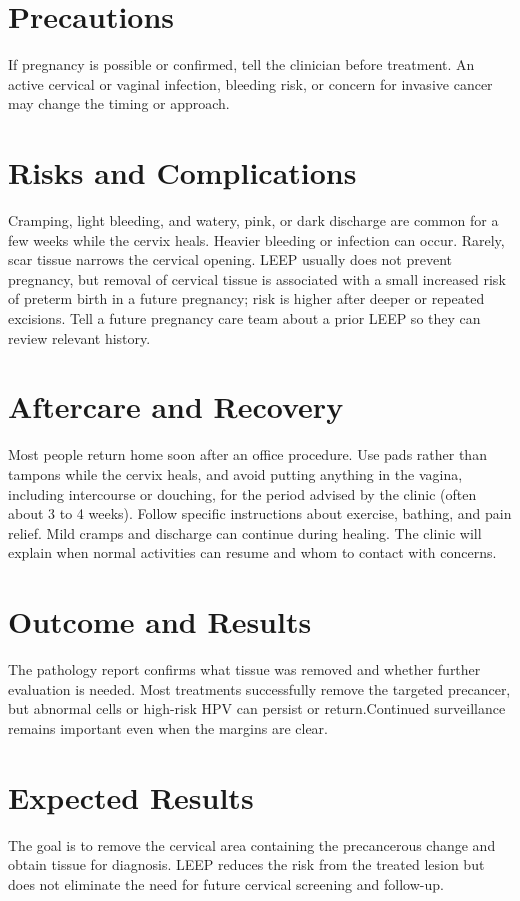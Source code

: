 \section*{Precautions}
If pregnancy is possible or confirmed, tell the clinician before treatment. An active cervical or vaginal infection, bleeding risk, or concern for invasive cancer may change the timing or approach.

\section*{Risks and Complications}
Cramping, light bleeding, and watery, pink, or dark discharge are common for a few weeks while the cervix heals. Heavier bleeding or infection can occur. Rarely, scar tissue narrows the cervical opening. LEEP usually does not prevent pregnancy, but removal of cervical tissue is associated with a small increased risk of preterm birth in a future pregnancy; risk is higher after deeper or repeated excisions. Tell a future pregnancy care team about a prior LEEP so they can review relevant history.

\section*{Aftercare and Recovery}
Most people return home soon after an office procedure. Use pads rather than tampons while the cervix heals, and avoid putting anything in the vagina, including intercourse or douching, for the period advised by the clinic (often about 3 to 4 weeks). Follow specific instructions about exercise, bathing, and pain relief. Mild cramps and discharge can continue during healing. The clinic will explain when normal activities can resume and whom to contact with concerns.

\section*{Outcome and Results}
The pathology report confirms what tissue was removed and whether further evaluation is needed. Most treatments successfully remove the targeted precancer, but abnormal cells or high-risk HPV can persist or return.Continued surveillance remains important even when the margins are clear.

\section*{Expected Results}
The goal is to remove the cervical area containing the precancerous change and obtain tissue for diagnosis. LEEP reduces the risk from the treated lesion but does not eliminate the need for future cervical screening and follow-up.


